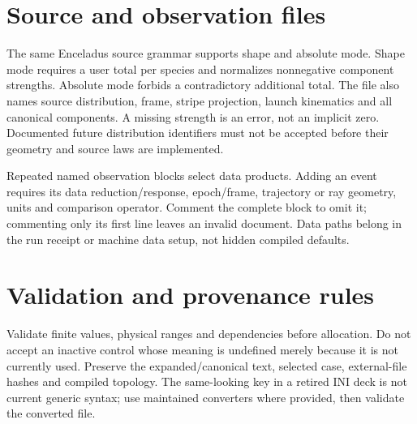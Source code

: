 \section{Source and observation files}
The same Enceladus source grammar supports shape and absolute mode.
Shape mode requires a user total per species and normalizes nonnegative
component strengths. Absolute mode forbids a contradictory additional total.
The file also names source distribution, frame, stripe projection, launch
kinematics and all canonical components. A missing strength is an error,
not an implicit zero. Documented future distribution identifiers must not be
accepted before their geometry and source laws are implemented.

Repeated named observation blocks select data products. Adding an event
requires its data reduction/response, epoch/frame, trajectory or ray geometry,
units and comparison operator. Comment the complete block to omit it;
commenting only its first line leaves an invalid document. Data paths belong
in the run receipt or machine data setup, not hidden compiled defaults.

\section{Validation and provenance rules}
Validate finite values, physical ranges and dependencies before allocation.
Do not accept an inactive control whose meaning is undefined merely because
it is not currently used. Preserve the expanded/canonical text, selected case,
external-file hashes and compiled topology. The same-looking key in a retired
INI deck is not current generic syntax; use maintained converters where
provided, then validate the converted file.
